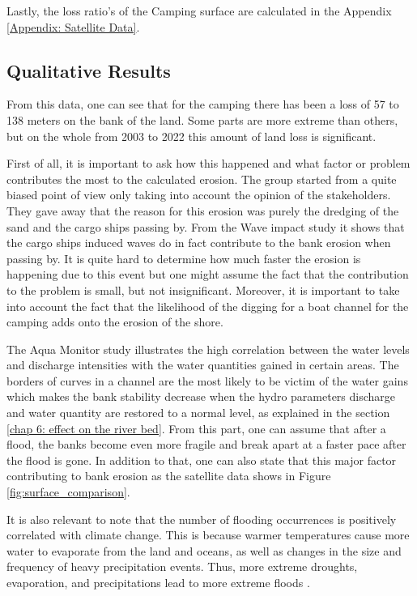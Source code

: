Lastly, the loss ratio's of the Camping surface are calculated in the Appendix \ref{Appendix: Satellite Data}. 

\subsection{Qualitative Results}
From this data, one can see that for the camping there has been a loss of 57 to 138 meters on the bank of the land. Some parts are more extreme than others, but on the whole from 2003 to 2022 this amount of land loss is significant.

First of all, it is important to ask how this happened and what factor or problem contributes the most to the calculated erosion. The group started from a quite biased point of view only taking into account the opinion of the stakeholders. They gave away that the reason for this erosion was purely the dredging of the sand and the cargo ships passing by. From the Wave impact study it shows that the cargo ships induced waves do in fact contribute to the bank erosion when passing by. It is quite hard to determine how much faster the erosion is happening due to this event but one might assume the fact that the contribution to the problem is small, but not insignificant. Moreover, it is important to take into account the fact that the likelihood of the digging for a boat channel for the camping adds onto the erosion of the shore.

The Aqua Monitor study illustrates the high correlation between the water levels and discharge intensities with the water quantities gained in certain areas. The borders of curves in a channel are the most likely to be victim of the water gains which makes the bank stability decrease when the hydro parameters discharge and water quantity are restored to a normal level, as explained in the section \ref{chap 6: effect on the river bed}. From this part, one can assume that after a flood, the banks become even more fragile and break apart at a faster pace after the flood is gone. In addition to that, one can also state that this major factor contributing to bank erosion as the satellite data shows in Figure \ref{fig:surface_comparison}.

It is also relevant to note that the number of flooding occurrences is positively correlated with climate change. This is because warmer temperatures cause more water to evaporate from the land and oceans, as well as changes in the size and frequency of heavy precipitation events. Thus, more extreme droughts, evaporation, and precipitations lead to more extreme floods \autocite{usenvironmentalprotectionagencyClimateChangeIndicators2016}.

